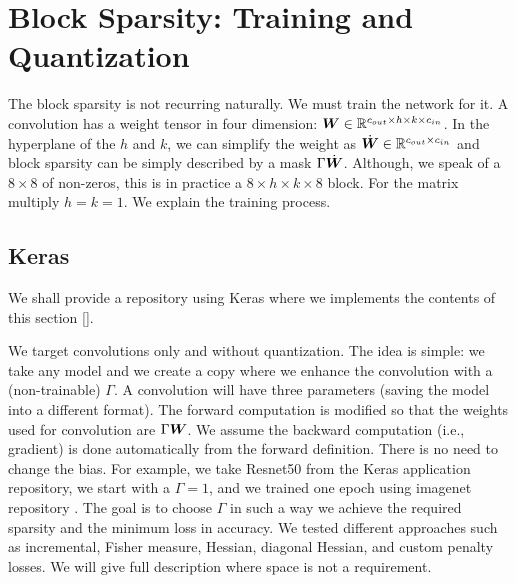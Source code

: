 \documentclass{IEEEtran}
\begin{document}
\section{Block Sparsity: Training and Quantization}
\label{sec:training}

The block sparsity is not recurring naturally.  We must train the
network for it.  A convolution has a weight tensor in four dimension:
${\boldsymbol W} \in \mathbb{R}^{c_{out}\times h \times k \times c_{in}}$. In the
hyperplane of the $h$ and $k$, we can simplify the weight as
$\dot{{\boldsymbol W}} \in \mathbb{R}^{c_{out} \times c_{in}}$ and block sparsity can
be simply described by a mask $\Gamma\dot{{\boldsymbol W}}$. Although, we speak
of a $8\times 8$ of non-zeros, this is in practice a $8\times h\times
k\times 8$ block. For the matrix multiply $h=k=1$. We explain the
training process.


\subsection{Keras}
We shall provide a repository using Keras \cite{chollet2015keras}
where we implements the contents of this section []. %

We target convolutions only and without quantization. The idea is
simple: we take any model and we create a copy where we enhance the
convolution with a (non-trainable) $\Gamma$. A convolution will have
three parameters (saving the model into a different format).  The
forward computation is modified so that the weights used for
convolution are $\Gamma{\boldsymbol W}$. We assume the backward computation
(i.e., gradient) is done automatically from the forward
definition. There is no need to change the bias. For example, we take
Resnet50 from the Keras application repository, we start with a
$\Gamma=1$, and we trained one epoch using imagenet repository
\cite{deng2009imagenet}.  The goal is to choose $\Gamma$ in such a way
we achieve the required sparsity and the minimum loss in accuracy. We
tested different approaches such as incremental, Fisher measure,
Hessian, diagonal Hessian, and custom penalty losses. We will give
full description where space is not a requirement.
\end{document}
